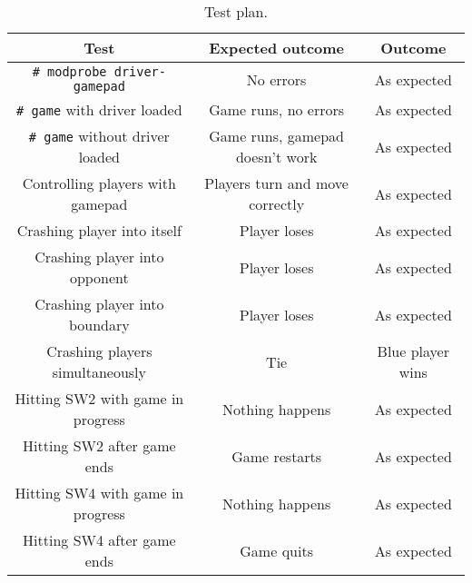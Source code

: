 \vspace{2em}
\begin{table}[h]
\centering
\begin{tabular}{ccc}
Test & Expected outcome & Outcome \\\hline
\texttt{\# modprobe driver-gamepad} & No errors & As expected \\
\texttt{\# game} with driver loaded& Game runs, no errors & As expected \\
\texttt{\# game} without driver loaded & Game runs, gamepad doesn't work & As expected \\
Controlling players with gamepad & Players turn and move correctly & As expected \\
Crashing player into itself & Player loses & As expected \\
Crashing player into opponent & Player loses & As expected \\
Crashing player into boundary & Player loses & As expected \\
Crashing players simultaneously & Tie & Blue player wins \\
Hitting SW2 with game in progress & Nothing happens & As expected \\
Hitting SW2 after game ends & Game restarts & As expected \\
Hitting SW4 with game in progress & Nothing happens & As expected \\
Hitting SW4 after game ends & Game quits & As expected
\end{tabular}
\caption{Test plan.}
\label{tab:testing}
\end{table}


